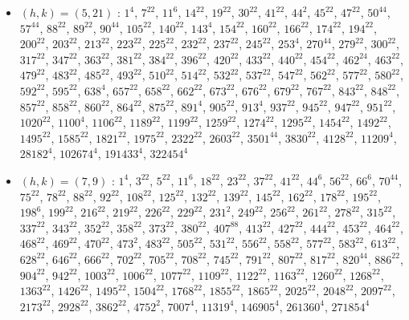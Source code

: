 \begin{itemize}
\item $(h,k)=(5,21)$ : $1^{4}$, $7^{22}$, $11^{6}$, $14^{22}$, $19^{22}$, $30^{22}$, $41^{22}$, $44^{2}$, $45^{22}$, $47^{22}$, $50^{44}$, $57^{44}$, $88^{22}$, $89^{22}$, $90^{44}$, $105^{22}$, $140^{22}$, $143^{4}$, $154^{22}$, $160^{22}$, $166^{22}$, $174^{22}$, $194^{22}$, $200^{22}$, $203^{22}$, $213^{22}$, $223^{22}$, $225^{22}$, $232^{22}$, $237^{22}$, $245^{22}$, $253^{4}$, $270^{44}$, $279^{22}$, $300^{22}$, $317^{22}$, $347^{22}$, $363^{22}$, $381^{22}$, $384^{22}$, $396^{22}$, $420^{22}$, $433^{22}$, $440^{22}$, $454^{22}$, $462^{24}$, $463^{22}$, $479^{22}$, $483^{22}$, $485^{22}$, $493^{22}$, $510^{22}$, $514^{22}$, $532^{22}$, $537^{22}$, $547^{22}$, $562^{22}$, $577^{22}$, $580^{22}$, $592^{22}$, $595^{22}$, $638^{4}$, $657^{22}$, $658^{22}$, $662^{22}$, $673^{22}$, $676^{22}$, $679^{22}$, $767^{22}$, $843^{22}$, $848^{22}$, $857^{22}$, $858^{22}$, $860^{22}$, $864^{22}$, $875^{22}$, $891^{4}$, $905^{22}$, $913^{4}$, $937^{22}$, $945^{22}$, $947^{22}$, $951^{22}$, $1020^{22}$, $1100^{4}$, $1106^{22}$, $1189^{22}$, $1199^{22}$, $1259^{22}$, $1274^{22}$, $1295^{22}$, $1454^{22}$, $1492^{22}$, $1495^{22}$, $1585^{22}$, $1821^{22}$, $1975^{22}$, $2322^{22}$, $2603^{22}$, $3501^{44}$, $3830^{22}$, $4128^{22}$, $11209^{4}$, $28182^{4}$, $102674^{4}$, $191433^{4}$, $322454^{4}$
\item $(h,k)=(7,9)$ : $1^{4}$, $3^{22}$, $5^{22}$, $11^{6}$, $18^{22}$, $23^{22}$, $37^{22}$, $41^{22}$, $44^{6}$, $56^{22}$, $66^{6}$, $70^{44}$, $75^{22}$, $78^{22}$, $88^{22}$, $92^{22}$, $108^{22}$, $125^{22}$, $132^{22}$, $139^{22}$, $145^{22}$, $162^{22}$, $178^{22}$, $195^{22}$, $198^{6}$, $199^{22}$, $216^{22}$, $219^{22}$, $226^{22}$, $229^{22}$, $231^{2}$, $249^{22}$, $256^{22}$, $261^{22}$, $278^{22}$, $315^{22}$, $337^{22}$, $343^{22}$, $352^{22}$, $358^{22}$, $373^{22}$, $380^{22}$, $407^{88}$, $413^{22}$, $427^{22}$, $444^{22}$, $453^{22}$, $464^{22}$, $468^{22}$, $469^{22}$, $470^{22}$, $473^{2}$, $483^{22}$, $505^{22}$, $531^{22}$, $556^{22}$, $558^{22}$, $577^{22}$, $583^{22}$, $613^{22}$, $628^{22}$, $646^{22}$, $666^{22}$, $702^{22}$, $705^{22}$, $708^{22}$, $745^{22}$, $791^{22}$, $807^{22}$, $817^{22}$, $820^{44}$, $886^{22}$, $904^{22}$, $942^{22}$, $1003^{22}$, $1006^{22}$, $1077^{22}$, $1109^{22}$, $1122^{22}$, $1163^{22}$, $1260^{22}$, $1268^{22}$, $1363^{22}$, $1426^{22}$, $1495^{22}$, $1504^{22}$, $1768^{22}$, $1855^{22}$, $1865^{22}$, $2025^{22}$, $2048^{22}$, $2097^{22}$, $2173^{22}$, $2928^{22}$, $3862^{22}$, $4752^{2}$, $7007^{4}$, $11319^{4}$, $146905^{4}$, $261360^{4}$, $271854^{4}$

\end{itemize}
